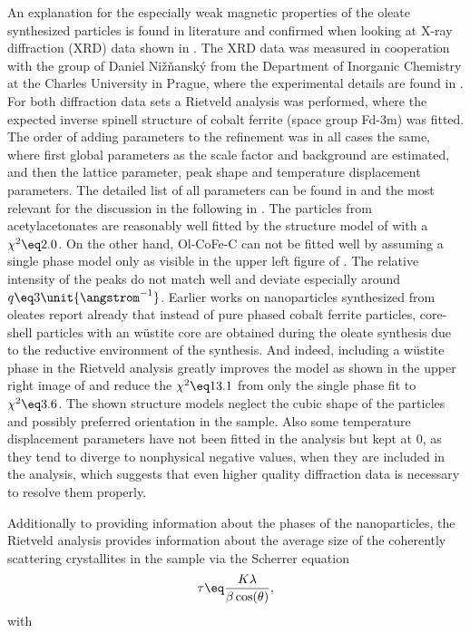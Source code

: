 \documentclass[\main/dresen_thesis.tex]{subfiles}
\begin{document}
    An explanation for the especially weak magnetic properties of the oleate synthesized particles is found in literature and confirmed when looking at X-ray diffraction (XRD) data shown in .
    The XRD data was measured in cooperation with the group of Daniel Nižňanský from the Department of Inorganic Chemistry at the Charles University in Prague, where the experimental details are found in .
    For both diffraction data sets a Rietveld analysis was performed, where the expected inverse spinell structure of cobalt ferrite (space group Fd-3m) was fitted.
    The order of adding parameters to the refinement was in all cases the same, where first global parameters as the scale factor and background are estimated, and then the lattice parameter, peak shape and temperature displacement parameters.
    The detailed list of all parameters can be found in  and the most relevant for the discussion in the following in .
    The particles from acetylacetonates are reasonably well fitted by the structure model of  with a $\chi^2 \eq 2.0$.
    On the other hand, Ol-CoFe-C can not be fitted well by assuming a single phase model only as visible in the upper left figure of .
    The relative intensity of the peaks do not match well and deviate especially around $q \eq 3 \unit{\angstrom^{-1}}$.
    Earlier works on nanoparticles synthesized from oleates \cite{Bodnarchuk_2009_Excha, Wetterskog_2013_Anoma} report already that instead of pure phased cobalt ferrite particles, core-shell particles with an w\"ustite core are obtained during the oleate synthesis due to the reductive environment of the synthesis.
    And indeed, including a w\"ustite phase in the Rietveld analysis greatly improves the model as shown in the upper right image of  and reduce the $\chi^2 \eq 13.1$ from only the single phase fit to $\chi^2 \eq 3.6$.
    The shown structure models neglect the cubic shape of the particles and possibly preferred orientation in the sample.
    Also some temperature displacement parameters have not been fitted in the analysis but kept at $0$, as they tend to diverge to nonphysical negative values, when they are included in the analysis, which suggests that even higher quality diffraction data is necessary to resolve them properly.

    Additionally to providing information about the phases of the nanoparticles, the Rietveld analysis provides information about the average size of the coherently scattering crystallites in the sample via the Scherrer equation
    \begin{equation}
      \tau \eq \frac{K \lambda}{\beta \cos(\theta)},
    \end{equation}
    with 
\end{document}
